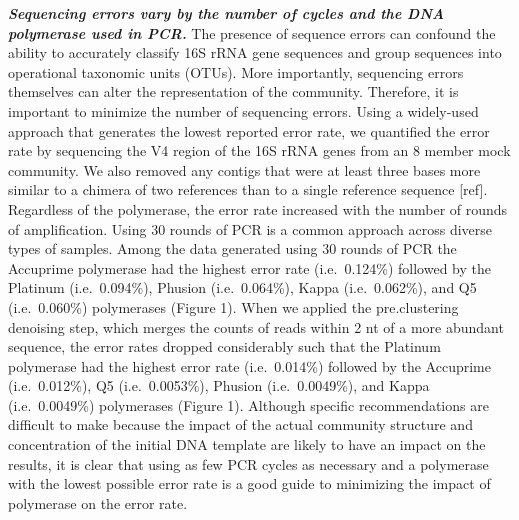 \documentclass[11pt,]{article}
\begin{document}
\textbf{\emph{Sequencing errors vary by the number of cycles and the DNA
polymerase used in PCR.}} The presence of sequence errors can confound
the ability to accurately classify 16S rRNA gene sequences and group
sequences into operational taxonomic units (OTUs). More importantly,
sequencing errors themselves can alter the representation of the
community. Therefore, it is important to minimize the number of
sequencing errors. Using a widely-used approach that generates the
lowest reported error rate, we quantified the error rate by sequencing
the V4 region of the 16S rRNA genes from an 8 member mock community. We
also removed any contigs that were at least three bases more similar to
a chimera of two references than to a single reference sequence
{[}ref{]}. Regardless of the polymerase, the error rate increased with
the number of rounds of amplification. Using 30 rounds of PCR is a
common approach across diverse types of samples. Among the data
generated using 30 rounds of PCR the Accuprime polymerase had the
highest error rate (i.e.~0.124\%) followed by the Platinum
(i.e.~0.094\%), Phusion (i.e.~0.064\%), Kappa (i.e.~0.062\%), and Q5
(i.e.~0.060\%) polymerases (Figure 1). When we applied the
pre.clustering denoising step, which merges the counts of reads within 2
nt of a more abundant sequence, the error rates dropped considerably
such that the Platinum polymerase had the highest error rate
(i.e.~0.014\%) followed by the Accuprime (i.e.~0.012\%), Q5
(i.e.~0.0053\%), Phusion (i.e.~0.0049\%), and Kappa (i.e.~0.0049\%)
polymerases (Figure 1). Although specific recommendations are difficult
to make because the impact of the actual community structure and
concentration of the initial DNA template are likely to have an impact
on the results, it is clear that using as few PCR cycles as necessary
and a polymerase with the lowest possible error rate is a good guide to
minimizing the impact of polymerase on the error rate.
\end{document}
